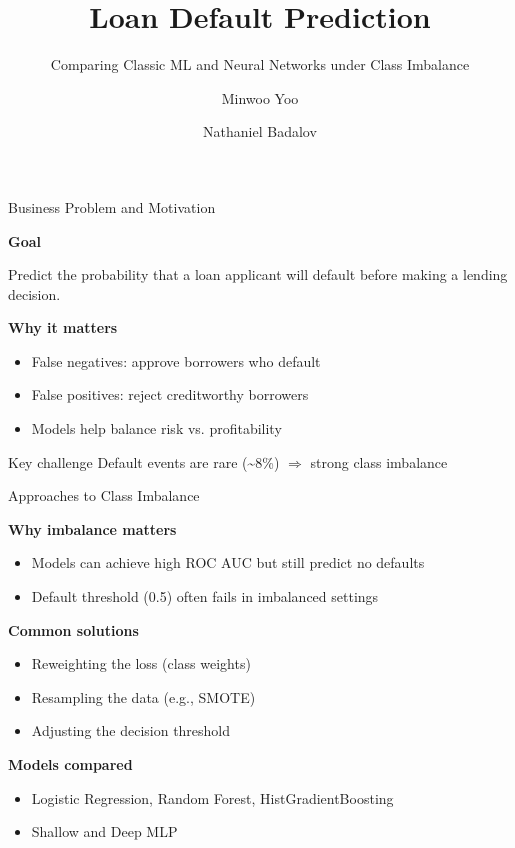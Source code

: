 \documentclass[aspectratio=169,11pt]{beamer}
\title{Loan Default Prediction}
\subtitle{Comparing Classic ML and Neural Networks under Class Imbalance}
\author{Minwoo Yoo \and Nathaniel Badalov}
\institute{Home Credit Default Risk (Kaggle)}
\date{}
\begin{document}

\maketitle


\begin{frame}{Business Problem and Motivation}

\textbf{Goal}

Predict the probability that a loan applicant will default before making a lending decision.

\vspace{0.4cm}

\textbf{Why it matters}
\begin{itemize}
    \item False negatives: approve borrowers who default
    \item False positives: reject creditworthy borrowers
    \item Models help balance risk vs. profitability
\end{itemize}

\vspace{0.4cm}

\begin{block}{Key challenge}
Default events are rare (\textasciitilde 8\%) $\Rightarrow$ strong class imbalance
\end{block}

\end{frame}


\begin{frame}{Approaches to Class Imbalance}

\scriptsize

\textbf{Why imbalance matters}
\begin{itemize}
    \item Models can achieve high ROC AUC but still predict no defaults
    \item Default threshold (0.5) often fails in imbalanced settings
\end{itemize}

\textbf{Common solutions}
\begin{itemize}
    \item Reweighting the loss (class weights)
    \item Resampling the data (e.g., SMOTE)
    \item Adjusting the decision threshold
\end{itemize}

\textbf{Models compared}
\begin{itemize}
    \item Logistic Regression, Random Forest, HistGradientBoosting
    \item Shallow and Deep MLP
\end{itemize}

\end{frame}
\end{document}
